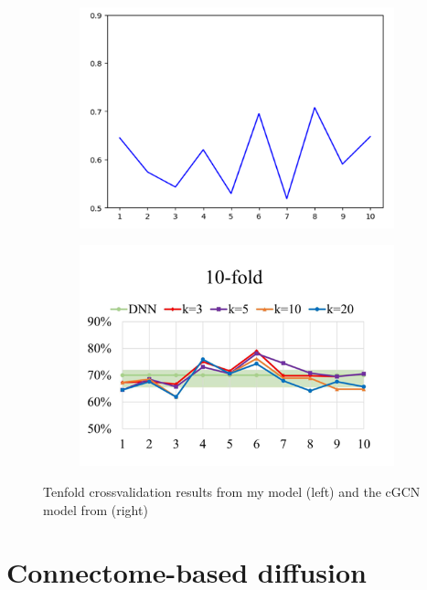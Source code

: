 	\begin{figure}[!h]
		\centering
		\begin{subfigure}[b]{0.45\textwidth}
			\centering
			\includegraphics[width=\textwidth]{figures/onlab_results.png}
		\end{subfigure}
		\hfill
		\begin{subfigure}[b]{0.45\textwidth}
			\centering
			\includegraphics[width=\textwidth]{figures/paper_results.png}
		\end{subfigure}
		\caption{Tenfold crossvalidation results from my model (left) and the cGCN model from \cite{wang2021graph} (right)}
		\label{fig:onlab_results}
	\end{figure}

\section{Connectome-based diffusion}
\label{sec:diffusion}
	
